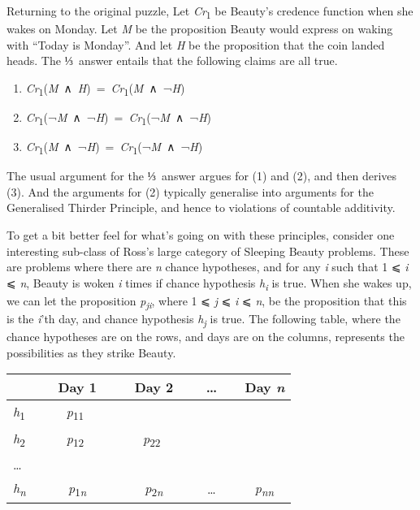 \documentclass[
  10pt,
  letterpaper,
  DIV=11,
  numbers=noendperiod,
  twoside]{scrartcl}
\providecommand{\tightlist}{%
  \setlength{\itemsep}{0pt}\setlength{\parskip}{0pt}}\usepackage{longtable,booktabs,array}
\begin{document}
Returning to the original puzzle, Let \emph{Cr}\textsubscript{1} be
Beauty's credence function when she wakes on Monday. Let \emph{M} be the
proposition Beauty would express on waking with ``Today is Monday''. And
let \emph{H} be the proposition that the coin landed heads. The ⅓~answer
entails that the following claims are all true.

\begin{enumerate}
\def\labelenumi{\arabic{enumi}.}
\tightlist
\item
  \emph{Cr}\textsubscript{1}(\emph{M}~∧~\emph{H})~=~\emph{Cr}\textsubscript{1}(\emph{M}~∧~¬\emph{H})
\item
  \emph{Cr}\textsubscript{1}(¬\emph{M}~∧~¬\emph{H})~=~\emph{Cr}\textsubscript{1}(¬\emph{M}~∧~¬\emph{H})
\item
  \emph{Cr}\textsubscript{1}(\emph{M}~∧~¬\emph{H})~=~\emph{Cr}\textsubscript{1}(¬\emph{M}~∧~¬\emph{H})
\end{enumerate}

The usual argument for the ⅓~answer argues for (1) and (2), and then
derives (3). And the arguments for (2) typically generalise into
arguments for the Generalised Thirder Principle, and hence to violations
of countable additivity.

To get a bit better feel for what's going on with these principles,
consider one interesting sub-class of Ross's large category of Sleeping
Beauty problems. These are problems where there are \emph{n} chance
hypotheses, and for any \emph{i} such that 1 ⩽ \emph{i} ⩽ \emph{n},
Beauty is woken \emph{i} times if chance hypothesis
\emph{h\textsubscript{i}} is true. When she wakes up, we can let the
proposition \emph{p\textsubscript{ji}}, where 1 ⩽ \emph{j} ⩽ \emph{i} ⩽
\emph{n}, be the proposition that this is the \emph{i}'th day, and
chance hypothesis \emph{h\textsubscript{j}} is true. The following
table, where the chance hypotheses are on the rows, and days are on the
columns, represents the possibilities as they strike Beauty.

\begin{longtable}[]{@{}lcccc@{}}
\toprule\noalign{}
~ & ~ Day 1 ~ & ~ Day 2 ~ & ~\ldots~ & ~Day \emph{n} \\
\midrule\noalign{}
\endhead
\bottomrule\noalign{}
\endlastfoot
\emph{h}\textsubscript{1}~ & ~\emph{p}\textsubscript{11} ~ & ~ ~ & ~ ~ &
~ \\
\emph{h}\textsubscript{2}~ & ~\emph{p}\textsubscript{12} ~ &
~\emph{p}\textsubscript{22} ~ & ~ ~ & ~ \\
\ldots{} ~ & ~ ~ & ~ ~ & ~ ~ & ~ \\
\emph{h\textsubscript{n}}~ & ~\emph{p}\textsubscript{1\emph{n}}~ &
~\emph{p}\textsubscript{2\emph{n}}~ & ~\ldots~ &
~\emph{p\textsubscript{nn}} \\
\end{longtable}
\end{document}
